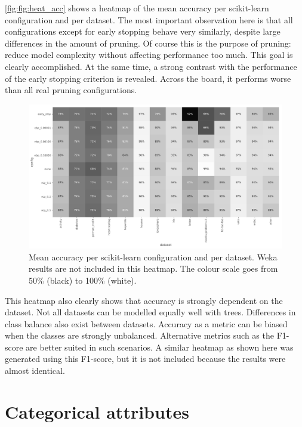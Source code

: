 \autoref{fig:fig:heat_acc} shows a heatmap of the mean accuracy per scikit-learn configuration and per dataset. The most important observation here is that all configurations except for early stopping behave very similarly, despite large differences in the amount of pruning. Of course this is the purpose of pruning: reduce model complexity without affecting performance too much. This goal is clearly accomplished. At the same time, a strong contrast with the performance of the early stopping criterion is revealed. Across the board, it performs worse than all real pruning configurations.

\begin{figure}[htp]
    \includegraphics[width=\textwidth]{img/heatmap_accuracy.pdf}
    \caption{Mean accuracy per scikit-learn configuration and per dataset. Weka results are not included in this heatmap. The colour scale goes from 50\% (black) to 100\% (white).}%
    \label{fig:heat_acc}
\end{figure}

This heatmap also clearly shows that accuracy is strongly dependent on the dataset. Not all datasets can be modelled equally well with trees. Differences in class balance also exist between datasets. Accuracy as a metric can be biased when the classes are strongly unbalanced. Alternative metrics such as the F1-score are better suited in such scenarios. A similar heatmap as shown here was generated using this F1-score, but it is not included because the results were almost identical.


\section{Categorical attributes}

